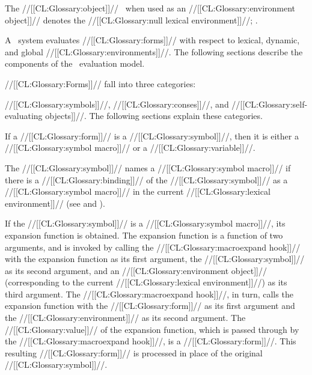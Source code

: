 The //[[CL:Glossary:object]]// \nil\ when used as an //[[CL:Glossary:environment object]]//
denotes the //[[CL:Glossary:null lexical environment]]//;
\seesection\NullLexicalEnv.

\endsubsubsection%

\endSubsection%


A \clisp\ system evaluates //[[CL:Glossary:forms]]// with respect to lexical,
dynamic, and global //[[CL:Glossary:environments]]//.  The following sections
describe the components of the \clisp\ evaluation model.




//[[CL:Glossary:Forms]]// fall into three categories:

//[[CL:Glossary:symbols]]//, //[[CL:Glossary:conses]]//, and //[[CL:Glossary:self-evaluating objects]]//.
The following sections explain these categories.
                                            

If a //[[CL:Glossary:form]]// is a //[[CL:Glossary:symbol]]//,
then it is either a //[[CL:Glossary:symbol macro]]// or a //[[CL:Glossary:variable]]//.

The //[[CL:Glossary:symbol]]// names a //[[CL:Glossary:symbol macro]]// 
if there is a //[[CL:Glossary:binding]]// of the //[[CL:Glossary:symbol]]// as a //[[CL:Glossary:symbol macro]]//
in the current //[[CL:Glossary:lexical environment]]// 
 (see  and ).

If the //[[CL:Glossary:symbol]]// is a //[[CL:Glossary:symbol macro]]//,
its expansion function is obtained.
The expansion function is a function of two arguments, and is invoked
by calling the //[[CL:Glossary:macroexpand hook]]// with 
     the expansion function as its first argument,
     the //[[CL:Glossary:symbol]]// as its second argument,
 and an //[[CL:Glossary:environment object]]// (corresponding to the current //[[CL:Glossary:lexical environment]]//)
      as its third argument.
The //[[CL:Glossary:macroexpand hook]]//, in turn, calls the expansion function with the
//[[CL:Glossary:form]]// as its first argument and the //[[CL:Glossary:environment]]// as its second argument.
The //[[CL:Glossary:value]]// of the expansion function, which is passed through
by the //[[CL:Glossary:macroexpand hook]]//, is a //[[CL:Glossary:form]]//. 
This resulting //[[CL:Glossary:form]]// is processed in place of the original //[[CL:Glossary:symbol]]//.

